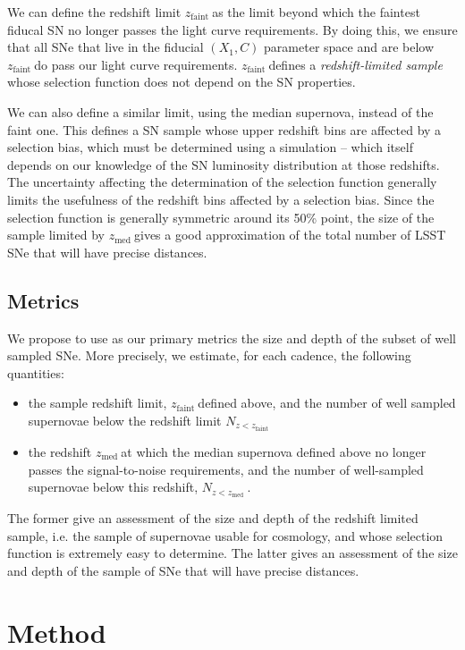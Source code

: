 \documentclass [11pt,a4paper]{article}
\newcommand{\zfaint}{$z_{\mathrm{faint}}\ $}
\newcommand{\nsnfaint}{$N_{z<z_{\mathrm{faint}}}\ $}
\newcommand{\zmed}{$z_{\mathrm{med}}\ $}
\newcommand{\nsnmed}{$N_{z<z_{\mathrm{med}}}\ $}
\begin{document}
We can define the redshift limit \zfaint as the limit beyond which the
faintest fiducal SN no longer passes the light curve requirements. By
doing this, we ensure that all SNe that live in the fiducial $(X_1,C)$
parameter space and are below \zfaint do pass our light curve
requirements.  \zfaint defines a {\em redshift-limited sample} whose
selection function does not depend on the SN properties.

We can also define a similar limit, using the median supernova,
instead of the faint one.  This defines a SN sample whose upper
redshift bins are affected by a selection bias, which must be
determined using a simulation -- which itself depends on our knowledge
of the SN luminosity distribution at those redshifts.  The uncertainty
affecting the determination of the selection function generally limits
the usefulness of the redshift bins affected by a selection bias.
Since the selection function is generally symmetric around its 50\%
point, the size of the sample limited by \zmed gives a good
approximation of the total number of LSST SNe that will have precise
distances.




\subsection{Metrics}

We propose to use as our primary metrics the size and depth of the
subset of well sampled SNe.  More precisely, we estimate, for each
cadence, the following quantities:

\begin{itemize}
\item the sample redshift limit, \zfaint defined above, and the number
  of well sampled supernovae below the redshift limit \nsnfaint
\item the redshift \zmed at which the median supernova defined above
  no longer passes the signal-to-noise requirements, and the number of
  well-sampled supernovae below this redshift, \nsnmed.  
\end{itemize}
The former give an assessment of the size and depth of the redshift
limited sample, i.e. the sample of supernovae usable for cosmology,
and whose selection function is extremely easy to determine.  The
latter gives an assessment of the size and depth of the sample of SNe
that will have precise distances.


\section{Method}
\end{document}
